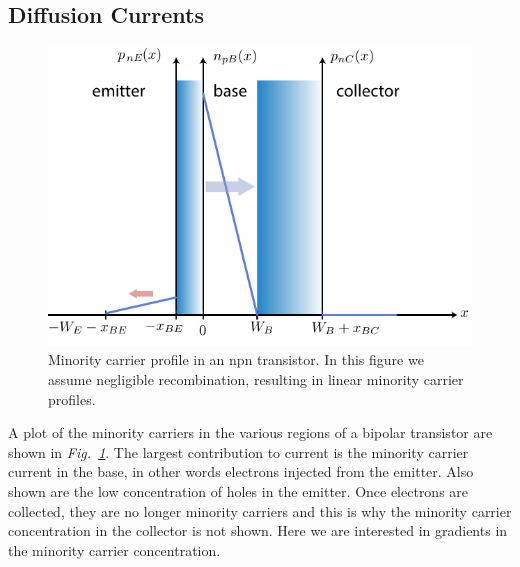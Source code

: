 \subsection{Diffusion Currents}
\begin{figure}[tb]
\centering
\includegraphics[width=.75\columnwidth]{slide10_minority_carriers}
\caption{Minority carrier profile in an npn transistor.  In this figure we assume negligible recombination, resulting in linear minority carrier profiles.}
\label{fig:slide10_minority_carriers}
\end{figure}
A plot of the minority carriers in the various regions of a bipolar transistor are shown in \emph{Fig.~\ref{fig:slide10_minority_carriers}}.  The largest contribution to current is the minority carrier current in the base, in other words electrons injected from the emitter.  Also shown are the low concentration of holes in the emitter.  Once electrons are collected, they are no longer minority carriers and this is why the minority carrier concentration in the collector is not shown.  Here we are interested in gradients in the minority carrier concentration.
